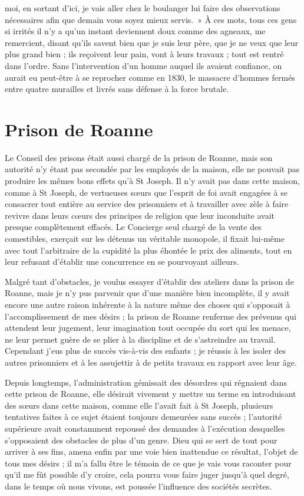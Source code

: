\documentclass[11pt,a4paper]{report}
\begin{document}
moi, en sortant d'ici, je vais aller chez le boulanger lui faire des observations nécessaires afin que demain vous soyez mieux servis.~» À ces mots, tous ces gens si irrités il n'y a qu'un instant deviennent doux comme des agneaux, me remercient, disant qu'ils savent bien que je suis leur père, que je ne veux que leur plus grand bien ; ils reçoivent leur pain, vont à leurs travaux ; tout est rentré dans l'ordre. Sans l'intervention d'un homme auquel ils avaient confiance, on aurait eu peut-être à se reprocher comme en 1830, le massacre d'hommes fermés entre quatre murailles et livrés sans défense à la force brutale.

\section*{Prison de Roanne}

Le Conseil des prisons était aussi chargé de la prison de Roanne, mais son autorité n'y étant pas secondée par les employés de la maison, elle ne pouvait pas produire les mêmes bons effets qu'à St Joseph. Il n'y avait pas dans cette maison, comme à St Joseph, de vertueuses sœurs que l'esprit de foi avait engagées à se consacrer tout entière au service des prisonniers et à travailler avec zèle à faire revivre dans leurs cœurs des principes de religion que leur inconduite avait presque complètement effacés. Le Concierge seul chargé de la vente des comestibles, exerçait sur les détenus un véritable monopole, il fixait lui-même avec tout l'arbitraire de la cupidité la plus éhontée le prix des aliments, tout en leur refusant d'établir une concurrence en se pourvoyant ailleurs.

Malgré tant d'obstacles, je voulus essayer d'établir des ateliers dans la prison de Roanne, mais je n'y pus parvenir que d'une manière bien incomplète, il y avait encore une autre raison inhérente à la nature même des choses qui s'opposait à l'accomplissement de mes désirs ; la prison de Roanne renferme des prévenus qui attendent leur jugement, leur imagination tout occupée du sort qui les menace, ne leur permet guère de se plier à la discipline et de s'astreindre au travail. Cependant j'eus plus de succès vis-à-vis des enfants ; je réussis à les isoler des autres prisonniers et à les assujettir à de petits travaux en rapport avec leur âge.

Depuis longtemps, l'administration gémissait des désordres qui régnaient dans cette prison de Roanne, elle désirait vivement y mettre un terme en introduisant des sœurs dans cette maison, comme elle l'avait fait à St Joseph, plusieurs tentatives faites à ce sujet étaient toujours demeurées sans succès ; l'autorité supérieure avait constamment repoussé des demandes à l'exécution desquelles s'opposaient des obstacles de plus d'un genre. Dieu qui se sert de tout pour arriver à ses fins, amena enfin par une voie bien inattendue ce résultat, l'objet de tous mes désirs ; il m'a fallu être le témoin de ce que je vais vous raconter pour qu'il me fût possible d'y croire, cela pourra vous faire juger jusqu'à quel degré, dans le temps où nous vivons, est poussée l'influence des sociétés secrètes.
\end{document}
